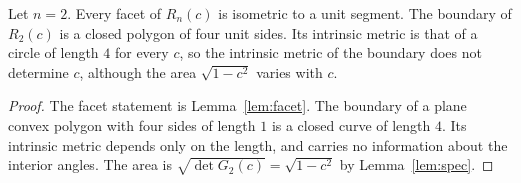 \begin{theorem}\label{thm:main}
Let $n=2$. Every facet of $R_n(c)$ is isometric to a unit segment.
The boundary of $R_2(c)$ is a closed polygon of four unit sides. Its intrinsic metric is that of a circle of length $4$ for every $c$, so the intrinsic metric of the boundary does not determine $c$, although the area $\sqrt{1-c^2}$ varies with $c$.
\end{theorem}
\begin{proof}
The facet statement is Lemma~\ref{lem:facet}.
The boundary of a plane convex polygon with four sides of length $1$ is a closed curve of length $4$. Its intrinsic metric depends only on the length, and carries no information about the interior angles. The area is $\sqrt{\det G_2(c)}=\sqrt{1-c^2}$ by Lemma~\ref{lem:spec}.
\end{proof}
